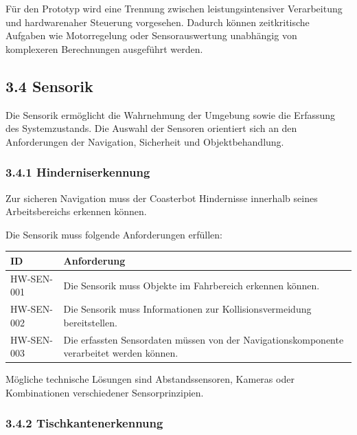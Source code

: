\documentclass[
  a4paper,
  12pt,
  DIV=12,        %
  parskip=half,  %
  headings=small %
]{scrartcl}
\theoremstyle{definition}
\theoremstyle{definition}
\begin{document}
Für den Prototyp wird eine Trennung zwischen leistungsintensiver
Verarbeitung und hardwarenaher Steuerung vorgesehen. Dadurch können
zeitkritische Aufgaben wie Motorregelung oder Sensorauswertung
unabhängig von komplexeren Berechnungen ausgeführt werden.

\subsection{3.4 Sensorik}\label{sensorik}

Die Sensorik ermöglicht die Wahrnehmung der Umgebung sowie die Erfassung
des Systemzustands. Die Auswahl der Sensoren orientiert sich an den
Anforderungen der Navigation, Sicherheit und Objektbehandlung.

\subsubsection{3.4.1 Hinderniserkennung}\label{hinderniserkennung}

Zur sicheren Navigation muss der Coasterbot Hindernisse innerhalb seines
Arbeitsbereichs erkennen können.

Die Sensorik muss folgende Anforderungen erfüllen:

\begin{longtable}[]{@{}
  >{\raggedright\arraybackslash}p{}
  >{\raggedright\arraybackslash}p{}@{}}
\toprule\noalign{}
\begin{minipage}[b]{\linewidth}\raggedright
ID
\end{minipage} & \begin{minipage}[b]{\linewidth}\raggedright
Anforderung
\end{minipage} \\
\midrule\noalign{}
\endhead
\bottomrule\noalign{}
\endlastfoot
HW-SEN-001 & Die Sensorik muss Objekte im Fahrbereich erkennen
können. \\
HW-SEN-002 & Die Sensorik muss Informationen zur Kollisionsvermeidung
bereitstellen. \\
HW-SEN-003 & Die erfassten Sensordaten müssen von der
Navigationskomponente verarbeitet werden können. \\
\end{longtable}

Mögliche technische Lösungen sind Abstandssensoren, Kameras oder
Kombinationen verschiedener Sensorprinzipien.

\subsubsection{3.4.2 Tischkantenerkennung}\label{tischkantenerkennung}
\end{document}
